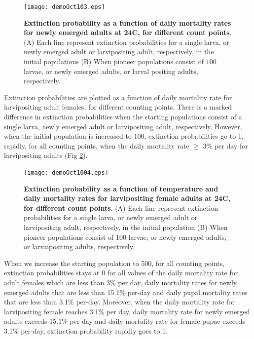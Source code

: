 \documentclass[smallextended]{svjour3}
\begin{document}
\begin{figure}[h]
	\texttt{[image: demoOct103.eps]}
	\caption{{\bf Extinction probability as a function of daily mortality rates for newly emerged adults at 24\degree C, for different count points}. (A) Each line represent extinction probabilities for a single larva, or  newly emerged adult or larvipositing adult, respectively,  in the initial populations (B) When pioneer populations consist of  $100$ larvae,  or newly emerged adults, or larval positing adults, respectively.}
	\label{fig:4}       %
\end{figure}
%

\newpage

Extinction probabilities are plotted as a function of daily mortality rate for larvipositing adult females, for different counting points. There is a marked difference in extinction probabilities when the starting populations consist of a single larva, newly emerged adult or larvipositing adult, respectively. However, when the initial population is increased to 100, extinction probabilities go to 1, rapidly, for all counting points, when the daily mortality rate $\geq$ 3\% per day for larvipositing adults (Fig \ref{fig:5}). 

 \begin{figure}[h]
 	\texttt{[image: demoOct1004.eps]}
 	\caption{{\bf Extinction probability as a function of temperature and daily mortality rates for larvipositing female adults at 24\degree C, for different count points}. (A) Each line represent extinction probabilities for a single larva, or  newly emerged adult or larvipositing adult, respectively, in the initial population (B) When pioneer populations consist of  $100$ larvae,  or  newly emerged adults, or larvaipositing adults, respectively.}
 	\label{fig:5}       %
 \end{figure}

When we increase the starting population to 500, for all counting points, extinction probabilities stays at 0 for all values of the daily mortality rate for adult females which are less than 3\% per day, daily mortality rates for newly emerged adults that are less than 15.1\% per-day and daily pupal mortality rates that are less than 3.1\% per-day. Moreover, when the daily mortality rate for larvipositing  female reaches 3.1\% per day, daily mortality rate for newly emerged adults exceeds 15.1\% per-day and daily mortality rate for female pupae exceeds 3.1\% per-day, extinction probability rapidly goes to 1. 
\end{document}
